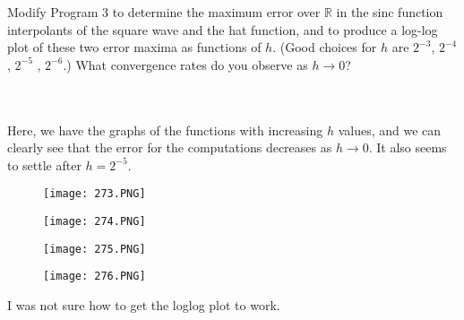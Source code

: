 Modify Program 3 to determine the maximum error over $\mathbb{R}$ in the sinc function interpolants
of the square wave and the hat function, and to produce a log-log plot of these two error maxima as
functions of $h$. (Good choices for $h$ are $2^{-3}$, $2^{-4}$, $2^{-5}$ , $2^{-6}$.) What convergence
rates do you observe as $h\rightarrow0$?\\\\

\begin{solution}\renewcommand{\qedsymbol}{}\ \\
    Here, we have the graphs of the functions with increasing $h$ values, and we can clearly see that
    the error for the computations decreases as $h\rightarrow0$. It also seems to settle after
    $h=2^{-5}$.

    \begin{figure}[htp]
        \centering
        \texttt{[image: 273.PNG]}
    \end{figure}
    \begin{figure}[htp]
        \centering
        \texttt{[image: 274.PNG]}
    \end{figure}
    \begin{figure}[htp]
        \centering
        \texttt{[image: 275.PNG]}
    \end{figure}
    \begin{figure}[htp]
        \centering
        \texttt{[image: 276.PNG]}
    \end{figure}

I was not sure how to get the loglog plot to work.

\end{solution}

\newpage

\newpage